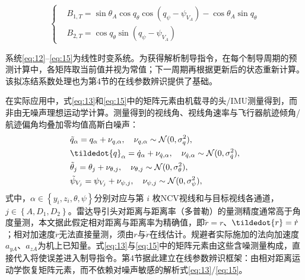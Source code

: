 \begin{equation}
\label{eq:15}
\left\{
\begin{aligned}
& {B_{1,T}} = \sin {\theta _A}\cos {q_\theta }\cos \left( {{q_\psi } - {\psi _{{V_A}}}} \right) - \cos {\theta _A}\sin {q_\theta } \\
& {B_{2,T}} = \cos {q_\theta }\sin \left( {{q_\psi } - {\psi _{{V_A}}}} \right)
\end{aligned}
\right.
\end{equation}
\begin{remark}
系统\eqref{eq:12}--\eqref{eq:15}为线性时变系统。为获得解析制导指令，在每个制导周期的预测计算中，各矩阵取当前值并视为常值；下一周期再根据更新后的状态重新计算。该拟冻结系数处理也为第4节的在线参数辨识提供了基础。
\end{remark}
\begin{assumption}[量测条件]
\label{asm:meas-noise}
在实际应用中，式\eqref{eq:13}和\eqref{eq:15}中的矩阵元素由机载寻的头/IMU测量得到，而非由无噪声理想运动学计算。测量得到的视线角、视线角速率与飞行器航迹倾角/航迹偏角均叠加零均值高斯白噪声：
\begin{equation}
\label{eq:16}
\begin{gathered}
  \tilde{q}_{\alpha} = {q_{\alpha}} + {\nu _{q,\alpha }},\quad {\nu _{q,\alpha }}\sim \mathcal{N}(0,\sigma _q^2), \hfill \\
  \tildedot{q}_{\alpha} = \dot{q}_{\alpha} + {\nu _{\dot q,\alpha }},\quad {\nu _{\dot q,\alpha }}\sim \mathcal{N}(0,\sigma _{\dot q}^2), \hfill \\
  \tilde{\theta}_{j} = {\theta _{j}} + {\nu _{\theta ,j}},\quad {\nu _{\theta ,j}}\sim \mathcal{N}(0,\sigma _\theta ^2), \hfill \\
  \tilde{\psi}_{V_{j}} = {\psi _{V_{j}}} + {\nu _{\psi ,j}},\quad {\nu _{\psi ,j}}\sim \mathcal{N}(0,\sigma _\psi ^2), \hfill \\ 
\end{gathered}
\end{equation}
式中，$\alpha  \in \left\{ {{y_i},{z_i},\theta ,\psi } \right\}$分别对应与第 $i$ 枚NCV视线和与目标视线各通道，$j \in \left\{ {A,{D_1},{D_2}} \right\}$。雷达导引头对距离与距离率（多普勒）的量测精度通常高于角度量测，本文据此假定相对距离与距离率为精确值，即$\tilde{r} = r$、$\tildedot{r} = \dot{r}$；相对加速度$\ddot{r}$无法直接量测，须由$r$与$\dot{r}$在线估计。规避者实际施加的法向加速度${a_{yA}}$、${a_{zA}}$为机上已知量。式\eqref{eq:13}与\eqref{eq:15}中的矩阵元素由这些含噪测量构成，直接代入将使误差进入制导指令。第4节据此建立在线参数辨识框架：由相对距离运动学恢复矩阵元素，而不依赖对噪声敏感的解析式\eqref{eq:13}/\eqref{eq:15}。
\end{assumption}

